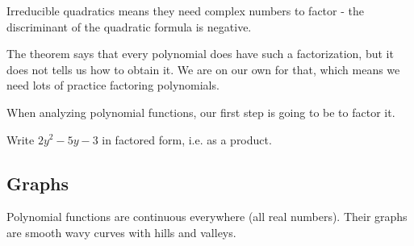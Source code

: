 \documentclass{ximera}
\begin{document}
Irreducible quadratics means they need complex numbers to factor - the discriminant of the quadratic formula is negative. 



The theorem says that every polynomial does have such a factorization, but it does not tells us how to obtain it.  We are on our own for that, which means we need lots of practice factoring polynomials.

When analyzing polynomial functions, our first step is going to be to factor it.







\begin{question}

Write $2y^2-5y-3$ in factored form, i.e. as a product.



\begin{multipleChoice}
\end{multipleChoice}

\end{question}




























\subsection*{Graphs}




Polynomial functions are continuous everywhere (all real numbers).  Their graphs are smooth wavy curves with hills and valleys.
\end{document}
